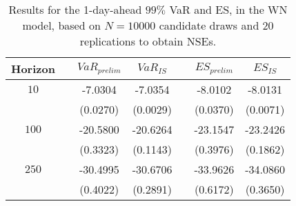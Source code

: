 \begin{table}[h] 
\centering 
\caption{Results for the 1-day-ahead $99\%$ VaR and ES, in the WN model, based on $N=10000$ candidate draws and $20$ replications to obtain NSEs.} 
\label{tab:res_WN} 
\begin{tabular}{ccccccc}  
 Horizon & & $VaR_{prelim}$ & $VaR_{IS}$ & & $ES_{prelim}$ & $ES_{IS}$ \\ \hline 
$10$ & & -7.0304 & -7.0354 & & -8.0102 & -8.0131  \\ 
 & & (0.0270) & (0.0029) & & (0.0370) & (0.0071)   \\ [1ex] 
$100$ & & -20.5800 & -20.6264 & & -23.1547 & -23.2426  \\ 
 & & (0.3323) & (0.1143) & & (0.3976) & (0.1862)   \\ [1ex] 
$250$ & & -30.4995 & -30.6706 & & -33.9626 & -34.0860  \\ 
 & & (0.4022) & (0.2891) & & (0.6172) & (0.3650)   \\ [1ex] 
\hline 
\end{tabular} 
\end{table} 
